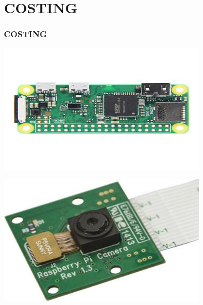\documentclass[
	11pt, %
	aspectratio=169, %
]{beamer}
\begin{document}
\section{COSTING}
\begin{frame}
	\frametitle{COSTING}
	
	\begin{center}
		\begin{minipage}{0.30\textwidth}
			\includegraphics[width=\textwidth]{./resized_400x250/Raspberry_zero.jpg}
		\end{minipage}\hfill
		\begin{minipage}{0.30\textwidth}
			\includegraphics[width=\textwidth]{./resized_400x250/raspberry pi cam.jpg}
		\end{minipage}\hfill
		\begin{minipage}{0.30\textwidth}

\end{minipage}
\end{center}
\end{frame}
\end{document}

